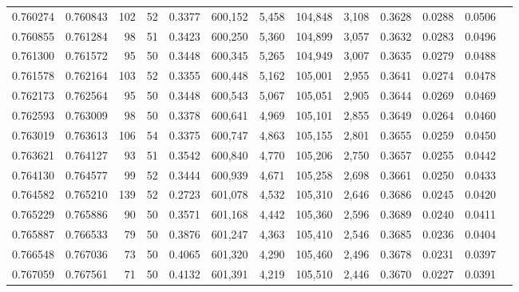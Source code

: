 \begin{tabular}{rrrrrrrrrrrrr}
0.760274 & 0.760843 &   102 &  52 &                                     0.3377 & 600,152 &   5,458 & 104,848 &   3,108 & 0.3628 & 0.0288 & 0.0506 \\
0.760855 & 0.761284 &    98 &  51 &                                     0.3423 & 600,250 &   5,360 & 104,899 &   3,057 & 0.3632 & 0.0283 & 0.0496 \\
0.761300 & 0.761572 &    95 &  50 &                                     0.3448 & 600,345 &   5,265 & 104,949 &   3,007 & 0.3635 & 0.0279 & 0.0488 \\
0.761578 & 0.762164 &   103 &  52 &                                     0.3355 & 600,448 &   5,162 & 105,001 &   2,955 & 0.3641 & 0.0274 & 0.0478 \\
0.762173 & 0.762564 &    95 &  50 &                                     0.3448 & 600,543 &   5,067 & 105,051 &   2,905 & 0.3644 & 0.0269 & 0.0469 \\
0.762593 & 0.763009 &    98 &  50 &                                     0.3378 & 600,641 &   4,969 & 105,101 &   2,855 & 0.3649 & 0.0264 & 0.0460 \\
0.763019 & 0.763613 &   106 &  54 &                                     0.3375 & 600,747 &   4,863 & 105,155 &   2,801 & 0.3655 & 0.0259 & 0.0450 \\
0.763621 & 0.764127 &    93 &  51 &                                     0.3542 & 600,840 &   4,770 & 105,206 &   2,750 & 0.3657 & 0.0255 & 0.0442 \\
0.764130 & 0.764577 &    99 &  52 &                                     0.3444 & 600,939 &   4,671 & 105,258 &   2,698 & 0.3661 & 0.0250 & 0.0433 \\
0.764582 & 0.765210 &   139 &  52 &                                     0.2723 & 601,078 &   4,532 & 105,310 &   2,646 & 0.3686 & 0.0245 & 0.0420 \\
0.765229 & 0.765886 &    90 &  50 &                                     0.3571 & 601,168 &   4,442 & 105,360 &   2,596 & 0.3689 & 0.0240 & 0.0411 \\
0.765887 & 0.766533 &    79 &  50 &                                     0.3876 & 601,247 &   4,363 & 105,410 &   2,546 & 0.3685 & 0.0236 & 0.0404 \\
0.766548 & 0.767036 &    73 &  50 &                                     0.4065 & 601,320 &   4,290 & 105,460 &   2,496 & 0.3678 & 0.0231 & 0.0397 \\
0.767059 & 0.767561 &    71 &  50 &                                     0.4132 & 601,391 &   4,219 & 105,510 &   2,446 & 0.3670 & 0.0227 & 0.0391 \\

\end{tabular}
